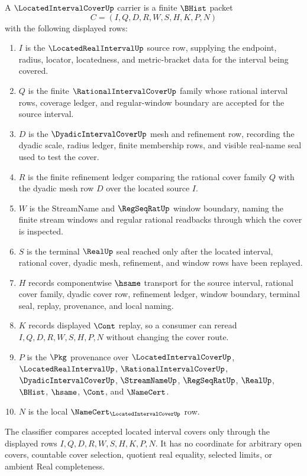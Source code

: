 \begin{definition}
\label{def:located-interval-cover-carrier}
A $\LocatedIntervalCoverUp$ carrier is a finite $\BHist$ packet
$$
C=(I,Q,D,R,W,S,H,K,P,N)
$$
with the following displayed rows:
\begin{enumerate}
\item $I$ is the $\LocatedRealIntervalUp$ source row, supplying the endpoint, radius, locator, locatedness, and metric-bracket data for the interval being covered.
\item $Q$ is the finite $\RationalIntervalCoverUp$ family whose rational interval rows, coverage ledger, and regular-window boundary are accepted for the source interval.
\item $D$ is the $\DyadicIntervalCoverUp$ mesh and refinement row, recording the dyadic scale, radius ledger, finite membership rows, and visible real-name seal used to test the cover.
\item $R$ is the finite refinement ledger comparing the rational cover family $Q$ with the dyadic mesh row $D$ over the located source $I$.
\item $W$ is the StreamName and $\RegSeqRatUp$ window boundary, naming the finite stream windows and regular rational readbacks through which the cover is inspected.
\item $S$ is the terminal $\RealUp$ seal reached only after the located interval, rational cover, dyadic mesh, refinement, and window rows have been replayed.
\item $H$ records componentwise $\hsame$ transport for the source interval, rational cover family, dyadic cover row, refinement ledger, window boundary, terminal seal, replay, provenance, and local naming.
\item $K$ records displayed $\Cont$ replay, so a consumer can reread $I,Q,D,R,W,S,H,P,N$ without changing the cover route.
\item $P$ is the $\Pkg$ provenance over $\LocatedIntervalCoverUp$, $\LocatedRealIntervalUp$, $\RationalIntervalCoverUp$, $\DyadicIntervalCoverUp$, $\StreamNameUp$, $\RegSeqRatUp$, $\RealUp$, $\BHist$, $\hsame$, $\Cont$, and $\NameCert$.
\item $N$ is the local $\NameCert_{\LocatedIntervalCoverUp}$ row.
\end{enumerate}
The classifier compares accepted located interval covers only through the displayed rows $I,Q,D,R,W,S,H,K,P,N$. It has no coordinate for arbitrary open covers, countable cover selection, quotient real equality, selected limits, or ambient Real completeness.
\end{definition}

